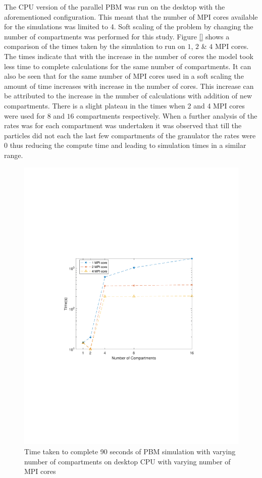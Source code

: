 \documentclass[preprint,10pt,authoryear,review]{elsarticle}
\begin{document}
\begin{linenumbers}
The CPU version of the parallel PBM was run on the desktop with the aforementioned 
configuration. This meant that the number of MPI cores available for the simulations 
was limited to 4. Soft scaling of the problem by changing the number of compartments 
was performed for this study. Figure \ref{} shows a comparison of the times taken 
by the simulation to run on $1$, $2$ \& $4$ MPI cores. The times indicate that 
with the increase in the number of cores the model took less time to complete 
calculations for the same number of compartments. It can also be seen that for the 
same number of MPI cores used in a soft scaling the amount of time increases 
with increase in the number of cores. This increase can be attributed to the 
increase in the number of calculations with addition of new compartments. There is a 
slight plateau in the times when 2 and 4 MPI cores were used for $8$ and $16$ compartments 
respectively. When a further analysis of the rates was for each compartment was undertaken 
it was observed that till the particles did not each the last few compartments of the 
granulator the rates were $0$ thus reducing the compute time and leading to simulation
times in a similar range. 

\begin{figure}[h]
\centering
\includegraphics[scale=0.7,trim=100 240 100 240, clip]{cpu_desktopTiming.pdf}
\caption{Time taken to complete 90 seconds of PBM simulation with varying number of compartments 
on desktop CPU with varying number of MPI cores}
\label{fig:res_cpu_timings}
\end{figure}


\end{linenumbers}
\end{document}
